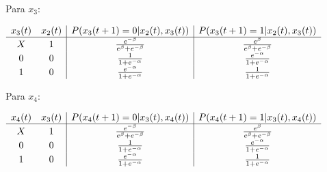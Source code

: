 \documentclass[12pt]{article}
\begin{document}
{Para $x_3$:

$\begin{array}{cc | c | c}
    x_3 (t) &  x_2 (t) &  P (x_3 (t + 1) = 0 | x_2 (t), x_3 (t)) 
                       &  P (x_3 (t + 1) = 1 | x_2 (t), x_3 (t))\\
    \hline
    X     &     1    &     
                          \frac{e^{-\beta}}{e^{\beta} + e^{-\beta}} &
                          \frac{e^{\beta}}{e^{\beta} + e^{-\beta}} \\
    0     &     0    &     
                          \frac{1}{1 + e^{-\alpha}} & 
                          \frac{e^{-\alpha}}{1 + e^{-\alpha}} \\
    1     &     0    &    
                          \frac{e^{-\alpha}}{1 + e^{-\alpha}} & 
                          \frac{1}{1 + e^{-\alpha}} \\
\end{array}$

\bigbreak

Para $x_4$:

$\begin{array}{cc | c | c}
    x_4 (t) &  x_3 (t) &  P (x_4 (t + 1) = 0 | x_3 (t), x_4 (t)) 
                       &  P (x_4 (t + 1) = 1 | x_3 (t), x_4 (t))\\
    \hline
    X     &     1    &     
                          \frac{e^{-\beta}}{e^{\beta} + e^{-\beta}} &
                          \frac{e^{\beta}}{e^{\beta} + e^{-\beta}} \\
    0     &     0    &     
                          \frac{1}{1 + e^{-\alpha}} & 
                          \frac{e^{-\alpha}}{1 + e^{-\alpha}} \\
    1     &     0    &    
                          \frac{e^{-\alpha}}{1 + e^{-\alpha}} & 
                          \frac{1}{1 + e^{-\alpha}} \\
\end{array}$

\bigbreak
}
\end{document}
